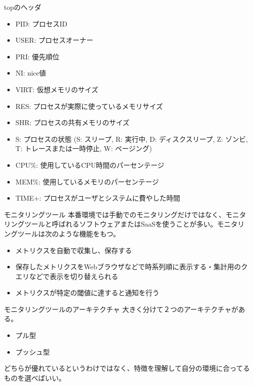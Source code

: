 \documentclass{beamer}
\begin{document}
\begin{frame}{topのヘッダ}
  \begin{itemize}
    \item PID: プロセスID
    \item USER: プロセスオーナー
    \item PRI: 優先順位
    \item NI: nice値
    \item VIRT: 仮想メモリのサイズ
    \item RES: プロセスが実際に使っているメモリサイズ
    \item SHR: プロセスの共有メモリのサイズ
    \item S: プロセスの状態 (S: スリープ, R: 実行中, D: ディスクスリープ, Z: ゾンビ, T: トレースまたは一時停止, W: ページング)
    \item CPU$\%$: 使用しているCPU時間のパーセンテージ
    \item MEM$\%$: 使用しているメモリのパーセンテージ
    \item TIME+: プロセスがユーザとシステムに費やした時間
  \end{itemize}
\end{frame}

\begin{frame}{モニタリングツール}
  本番環境では手動でのモニタリングだけではなく、モニタリングツールと呼ばれるソフトウェアまたはSaaSを使うことが多い。モニタリングツールは次のような機能をもつ。
  \begin{itemize}
    \item メトリクスを自動で収集し、保存する
    \item 保存したメトリクスをWebブラウザなどで時系列順に表示する・集計用のクエリなどで表示を切り替えられる
    \item メトリクスが特定の閾値に達すると通知を行う
  \end{itemize}
\end{frame}

\begin{frame}{モニタリングツールのアーキテクチャ}
  大きく分けて２つのアーキテクチャがある。
  \begin{itemize}
    \item プル型
    \item プッシュ型
  \end{itemize}
  どちらが優れているというわけではなく、特徴を理解して自分の環境に合ってるものを選べばいい。
\end{frame}
\end{document}

